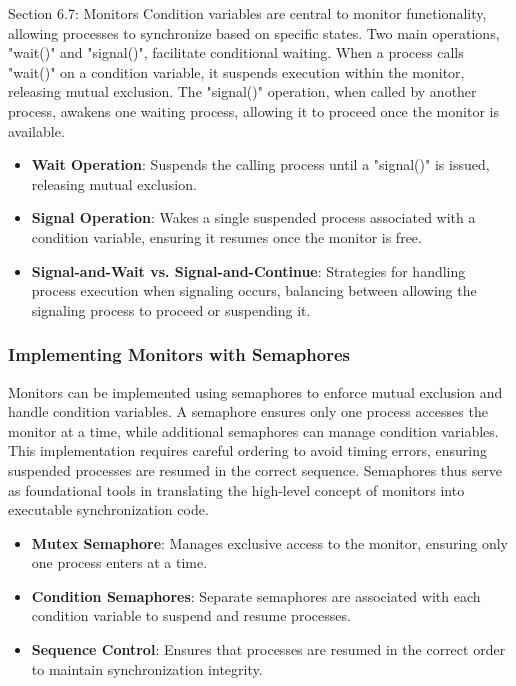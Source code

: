 \begin{notes}{Section 6.7: Monitors}
    Condition variables are central to monitor functionality, allowing processes to synchronize based on specific states. Two main operations, "wait()" and "signal()", facilitate conditional waiting. 
    When a process calls "wait()" on a condition variable, it suspends execution within the monitor, releasing mutual exclusion. The "signal()" operation, when called by another process, awakens one 
    waiting process, allowing it to proceed once the monitor is available.
    
    \begin{highlight}
    
        \begin{itemize}
            \item \textbf{Wait Operation}: Suspends the calling process until a "signal()" is issued, releasing mutual exclusion.
            \item \textbf{Signal Operation}: Wakes a single suspended process associated with a condition variable, ensuring it resumes once the monitor is free.
            \item \textbf{Signal-and-Wait vs. Signal-and-Continue}: Strategies for handling process execution when signaling occurs, balancing between allowing the signaling process to proceed or suspending it.
        \end{itemize}
    
    \end{highlight}
    
    \subsubsection*{Implementing Monitors with Semaphores}
    
    Monitors can be implemented using semaphores to enforce mutual exclusion and handle condition variables. A semaphore ensures only one process accesses the monitor at a time, while additional 
    semaphores can manage condition variables. This implementation requires careful ordering to avoid timing errors, ensuring suspended processes are resumed in the correct sequence. Semaphores thus 
    serve as foundational tools in translating the high-level concept of monitors into executable synchronization code.
    
    \begin{highlight}
    
        \begin{itemize}
            \item \textbf{Mutex Semaphore}: Manages exclusive access to the monitor, ensuring only one process enters at a time.
            \item \textbf{Condition Semaphores}: Separate semaphores are associated with each condition variable to suspend and resume processes.
            \item \textbf{Sequence Control}: Ensures that processes are resumed in the correct order to maintain synchronization integrity.
        \end{itemize}
    

\end{highlight}
\end{notes}

